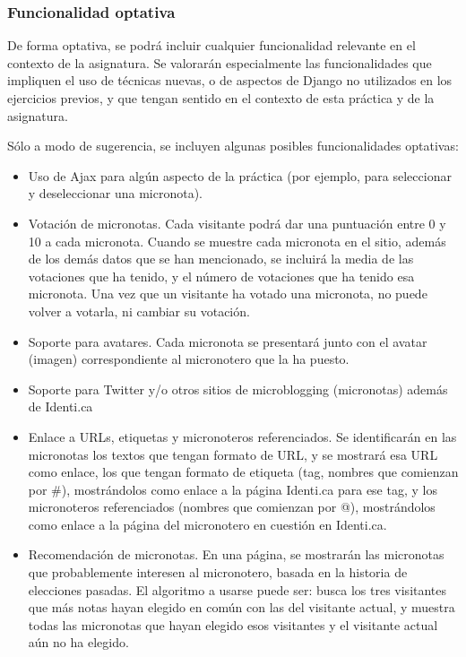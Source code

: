 \subsubsection{Funcionalidad optativa}

De forma optativa, se podrá incluir cualquier funcionalidad relevante en el contexto de la asignatura. Se valorarán especialmente las funcionalidades que impliquen el uso de técnicas nuevas, o de aspectos de Django no utilizados en los ejercicios previos, y que tengan sentido en el contexto de esta práctica y de la asignatura.

Sólo a modo de sugerencia, se incluyen algunas posibles funcionalidades optativas:

\begin{itemize}
\item Uso de Ajax para algún aspecto de la práctica (por ejemplo, para seleccionar y deseleccionar una micronota).
\item Votación de micronotas. Cada visitante podrá dar una puntuación entre 0 y 10 a cada micronota. Cuando se muestre cada micronota en el sitio, además de los demás datos que se han mencionado, se incluirá la media de las votaciones que ha tenido, y el número de votaciones que ha tenido esa micronota. Una vez que un visitante ha votado una micronota, no puede volver a votarla, ni cambiar su votación.
\item Soporte para avatares. Cada micronota se presentará junto con el avatar (imagen) correspondiente al micronotero que la ha puesto.
\item Soporte para Twitter y/o otros sitios de microblogging (micronotas) además de Identi.ca
\item Enlace a URLs, etiquetas y micronoteros referenciados. Se identificarán en las micronotas los textos que tengan formato de URL, y se mostrará esa URL como enlace, los que tengan formato de etiqueta (tag, nombres que comienzan por \#), mostrándolos como enlace a la página Identi.ca para ese tag, y los micronoteros referenciados (nombres que comienzan por @), mostrándolos como enlace a la página del micronotero en cuestión en Identi.ca.
\item Recomendación de micronotas. En una página, se mostrarán las micronotas que probablemente interesen al micronotero, basada en la historia de elecciones pasadas. El algoritmo a usarse puede ser: busca los tres visitantes que más notas hayan elegido en común con las del visitante actual, y muestra todas las micronotas que hayan elegido esos visitantes y el visitante actual aún no ha elegido.
\end{itemize}


